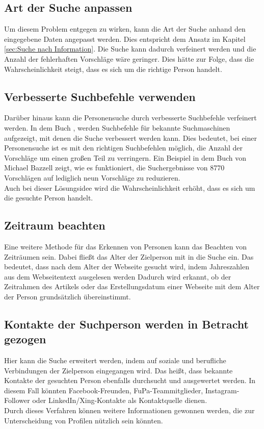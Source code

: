 	\subsection{Art der Suche anpassen}
	Um diesem Problem entgegen zu wirken, kann die Art der Suche anhand den eingegebene Daten angepasst werden. Dies entspricht dem Ansatz im Kapitel \ref{sec:Suche nach Information}. Die Suche kann dadurch verfeinert werden und die Anzahl der fehlerhaften Vorschläge wäre geringer. Dies hätte zur Folge, dass die Wahrscheinlichkeit steigt, dass es sich um die richtige Person handelt.\\
	
	\subsection{Verbesserte Suchbefehle verwenden}
	Darüber hinaus kann die Personensuche durch verbesserte Suchbefehle verfeinert werden. In dem Buch \cite{Bazzell}, werden Suchbefehle für bekannte Suchmaschinen aufgezeigt, mit denen die Suche verbessert werden kann. Dies bedeutet, bei einer Personensuche ist es mit den richtigen Suchbefehlen möglich, die Anzahl der Vorschläge um einen großen Teil zu verringern. Ein Beispiel in dem Buch von Michael Bazzell zeigt, wie es funktioniert, die Suchergebnisse von 8770 Vorschlägen auf lediglich neun Vorschläge zu reduzieren.\cite{Bazzell}\\ 
	Auch bei dieser Lösungsidee wird die Wahrscheinlichkeit erhöht, dass es sich um die gesuchte Person handelt.
	
	\subsection{Zeitraum beachten}
	Eine weitere Methode für das Erkennen von Personen kann das Beachten von Zeiträumen sein. Dabei fließt das Alter der Zielperson mit in die Suche ein. Das bedeutet, dass nach dem Alter der Webseite gesucht wird, indem Jahreszahlen aus dem Webseitentext ausgelesen werden Dadurch wird erkannt, ob der Zeitrahmen des Artikels oder das Erstellungsdatum einer Webseite mit dem Alter der Person grundsätzlich übereinstimmt.

	\subsection{Kontakte der Suchperson werden in Betracht gezogen}	
	Hier kann die Suche erweitert werden, indem auf soziale und berufliche Verbindungen der Zielperson eingegangen wird. Das heißt, dass bekannte Kontakte der gesuchten Person ebenfalls durchsucht und ausgewertet werden. In diesem Fall könnten Facebook-Freunden, FuPa-Teammitglieder, Instagram-Follower oder LinkedIn/Xing-Kontakte als Kontaktquelle dienen.\\
	Durch dieses Verfahren können weitere Informationen gewonnen werden, die zur Unterscheidung von Profilen nützlich sein könnten.
	
